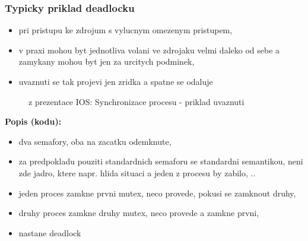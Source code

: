 \documentclass[a4paper, 11pt]{article}
\begin{document}
\subsubsection{Typicky priklad deadlocku}
\begin{itemize}
    \item pri pristupu ke zdrojum s vylucnym omezenym pristupem,
    \item v praxi mohou byt jednotliva volani ve zdrojaku velmi daleko od sebe a zamykany mohou byt jen za urcitych podminek,
    \item uvaznuti se tak projevi jen zridka a spatne se odaluje \\
\end{itemize}

\newpage

\begin{figure} [htb]
    \centering
    \caption{z prezentace IOS: Synchronizace procesu - priklad uvaznuti}
\end{figure}

\textbf{Popis (kodu):}
\begin{itemize}
    \item dva semafory, oba na zacatku odemknute,
    \item za predpokladu pouziti standardnich semaforu se standardni semantikou, neni zde jadro, ktere napr. hlida situaci a jeden z procesu by zabilo, ..
    \item jeden proces zamkne prvni mutex, neco provede, pokusi se zamknout druhy,
    \item druhy proces zamkne druhy mutex, neco provede a zamkne prvni,
    \item nastane deadlock \\
\end{itemize}
\end{document}
